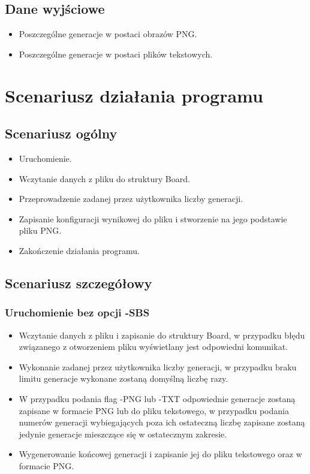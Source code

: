 \documentclass[12pt,a4paper,notitlepage]{report}
\begin{document}
\subsection{Dane wyjściowe}
\begin{itemize}
	\item Poszczególne generacje w postaci obrazów PNG.
	\item Poszczególne generacje w postaci plików tekstowych.
\end{itemize}

\section{Scenariusz działania programu}
\subsection{Scenariusz ogólny}
\begin{itemize}
\item Uruchomienie.
\item Wczytanie danych z pliku do struktury Board.
\item Przeprowadzenie zadanej przez użytkownika liczby generacji.
\item Zapisanie konfiguracji wynikowej do pliku i stworzenie na jego podstawie pliku PNG.
\item Zakończenie działania programu.
\end{itemize}
\subsection{Scenariusz szczegółowy}
\subsubsection{Uruchomienie bez opcji -SBS}
\begin{itemize}
\item Wczytanie danych z pliku i zapisanie do struktury Board,
w przypadku błędu związanego z otworzeniem pliku wyświetlany jest odpowiedni komunikat.
\item Wykonanie zadanej przez użytkownika liczby generacji,
w przypadku braku limitu generacje wykonane zostaną domyślną liczbę razy.
\item W przypadku podania flag -PNG lub -TXT odpowiednie generacje zostaną zapisane w formacie PNG lub do pliku tekstowego,
w przypadku podania numerów generacji wybiegających poza ich ostateczną liczbę zapisane zostaną jedynie generacje mieszczące się w ostatecznym zakresie.
\item Wygenerowanie końcowej generacji i zapisanie jej do pliku tekstowego oraz w formacie PNG.
\end{itemize}
\end{document}
